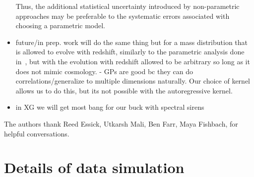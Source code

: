 \documentclass[]{aastex631}
\begin{document}
\begin{itemize}
Thus, the additional statistical uncertainty introduced by non-parametric approaches may be preferable to the systematic errors associated with choosing a parametric model.
    \item future/in prep. work will do the same thing but for a mass distribution that is allowed to evolve with redshift, similarly to the parametric analysis done in~\cite{ezquiaga_spectral_2022}, but with the evolution with redshift allowed to be arbitrary so long as it does not mimic cosmology. - GPs are good bc they can do correlations/generalize to multiple dimensions naturally. Our choice of kernel allows us to do this, but its not possible with the autoregressive kernel.
    \item in XG we will get most bang for our buck with spectral sirens
\end{itemize}
\begin{acknowledgments}
    The authors thank Reed Essick, Utkarsh Mali, Ben Farr, Maya Fishbach,  for helpful conversations.
\end{acknowledgments}


\appendix
\section{Details of data simulation}
\label{ap:data generation}
\end{document}
